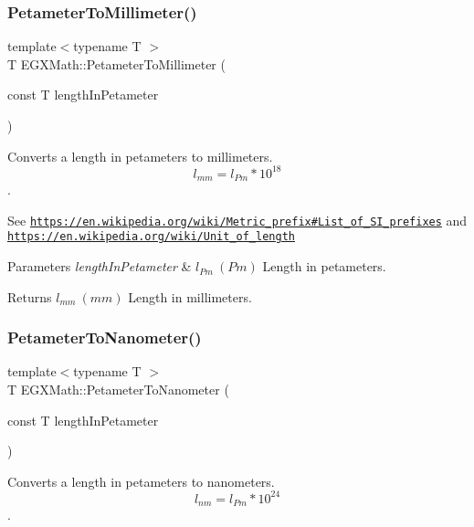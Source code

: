 \subsubsection{\texorpdfstring{Petameter\+To\+Millimeter()}{PetameterToMillimeter()}}
{\footnotesize\ttfamily template$<$typename T $>$ \\
T E\+G\+X\+Math\+::\+Petameter\+To\+Millimeter (\begin{DoxyParamCaption}\item[{const T}]{length\+In\+Petameter }\end{DoxyParamCaption})}



Converts a length in petameters to millimeters. \[ l_{mm}=l_{Pm} * 10^{18} \]. 

See \href{https://en.wikipedia.org/wiki/Metric_prefix#List_of_SI_prefixes}{\tt https\+://en.\+wikipedia.\+org/wiki/\+Metric\+\_\+prefix\#\+List\+\_\+of\+\_\+\+S\+I\+\_\+prefixes} and \href{https://en.wikipedia.org/wiki/Unit_of_length}{\tt https\+://en.\+wikipedia.\+org/wiki/\+Unit\+\_\+of\+\_\+length} 
\begin{DoxyParams}{Parameters}
{\em length\+In\+Petameter} & $ l_{Pm}\ (Pm)$ Length in petameters. \\
\hline
\end{DoxyParams}
\begin{DoxyReturn}{Returns}
$ l_{mm}\ (mm)$ Length in millimeters. 
\end{DoxyReturn}
\mbox{\label{group___e_g_x_math-_conversions-_length_conversions-_s_i-_petameter-_s_i_ga34b9bf3c48321cabdc394ab86a2e7cd7}} 
\subsubsection{\texorpdfstring{Petameter\+To\+Nanometer()}{PetameterToNanometer()}}
{\footnotesize\ttfamily template$<$typename T $>$ \\
T E\+G\+X\+Math\+::\+Petameter\+To\+Nanometer (\begin{DoxyParamCaption}\item[{const T}]{length\+In\+Petameter }\end{DoxyParamCaption})}



Converts a length in petameters to nanometers. \[ l_{nm}=l_{Pm} * 10^{24} \]. 

